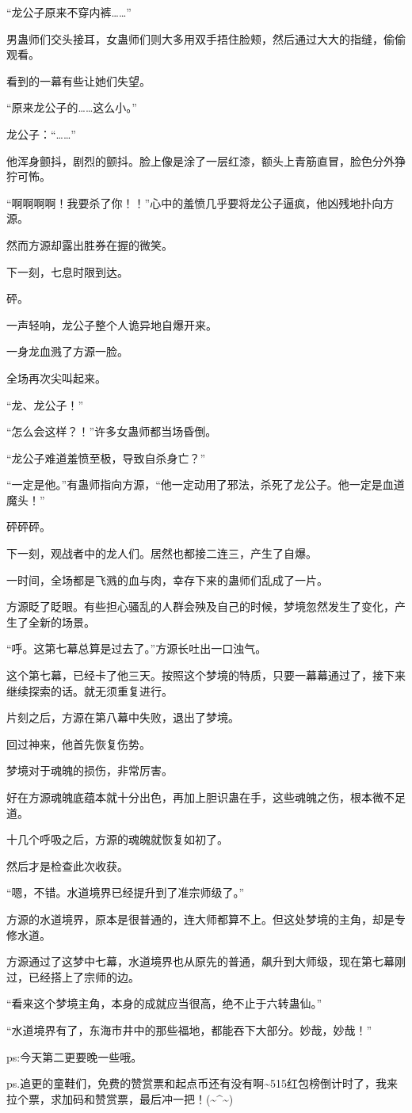 \begin{this_body}
“龙公子原来不穿内裤……”

男蛊师们交头接耳，女蛊师们则大多用双手捂住脸颊，然后通过大大的指缝，偷偷观看。

看到的一幕有些让她们失望。

“原来龙公子的……这么小。”

龙公子：“……”

他浑身颤抖，剧烈的颤抖。脸上像是涂了一层红漆，额头上青筋直冒，脸色分外狰狞可怖。

“啊啊啊啊！我要杀了你！！”心中的羞愤几乎要将龙公子逼疯，他凶残地扑向方源。

然而方源却露出胜券在握的微笑。

下一刻，七息时限到达。

砰。

一声轻响，龙公子整个人诡异地自爆开来。

一身龙血溅了方源一脸。

全场再次尖叫起来。

“龙、龙公子！”

“怎么会这样？！”许多女蛊师都当场昏倒。

“龙公子难道羞愤至极，导致自杀身亡？”

“一定是他。”有蛊师指向方源，“他一定动用了邪法，杀死了龙公子。他一定是血道魔头！”

砰砰砰。

下一刻，观战者中的龙人们。居然也都接二连三，产生了自爆。

一时间，全场都是飞溅的血与肉，幸存下来的蛊师们乱成了一片。

方源眨了眨眼。有些担心骚乱的人群会殃及自己的时候，梦境忽然发生了变化，产生了全新的场景。

“呼。这第七幕总算是过去了。”方源长吐出一口浊气。

这个第七幕，已经卡了他三天。按照这个梦境的特质，只要一幕幕通过了，接下来继续探索的话。就无须重复进行。

片刻之后，方源在第八幕中失败，退出了梦境。

回过神来，他首先恢复伤势。

梦境对于魂魄的损伤，非常厉害。

好在方源魂魄底蕴本就十分出色，再加上胆识蛊在手，这些魂魄之伤，根本微不足道。

十几个呼吸之后，方源的魂魄就恢复如初了。

然后才是检查此次收获。

“嗯，不错。水道境界已经提升到了准宗师级了。”

方源的水道境界，原本是很普通的，连大师都算不上。但这处梦境的主角，却是专修水道。

方源通过了这梦中七幕，水道境界也从原先的普通，飙升到大师级，现在第七幕刚过，已经搭上了宗师的边。

“看来这个梦境主角，本身的成就应当很高，绝不止于六转蛊仙。”

“水道境界有了，东海市井中的那些福地，都能吞下大部分。妙哉，妙哉！”

ps:今天第二更要晚一些哦。

ps.追更的童鞋们，免费的赞赏票和起点币还有没有啊\~{}515红包榜倒计时了，我来拉个票，求加码和赞赏票，最后冲一把！(\~{}\^{}\~{})

\end{this_body}

